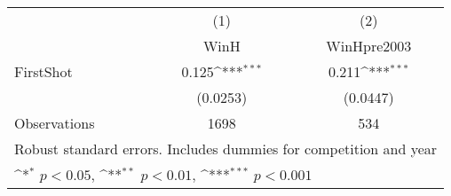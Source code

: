 {
\def\sym#1{\ifmmode^{#1}\else\(^{#1}\)\fi}
\begin{tabular}{l*{2}{c}}
\hline\hline
                    &\multicolumn{1}{c}{(1)}&\multicolumn{1}{c}{(2)}\\
                    &\multicolumn{1}{c}{WinH}&\multicolumn{1}{c}{WinHpre2003}\\
\hline
FirstShot           &       0.125\sym{***}&       0.211\sym{***}\\
                    &    (0.0253)         &    (0.0447)         \\
\hline
Observations        &        1698         &         534         \\
\hline\hline
\multicolumn{3}{l}{\footnotesize Robust standard errors. Includes dummies for competition and year}\\
\multicolumn{3}{l}{\footnotesize \sym{*} \(p<0.05\), \sym{**} \(p<0.01\), \sym{***} \(p<0.001\)}\\
\end{tabular}
}
